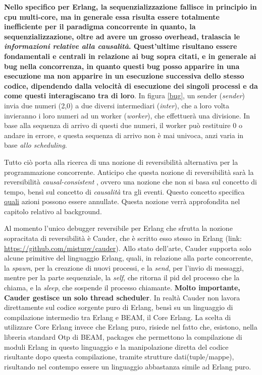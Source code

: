 \documentclass[Tesi.tex]{subfiles}
\begin{document}
\textbf{Nello specifico per Erlang, la sequenzializzazione fallisce in principio in cpu multi-core, ma in generale essa risulta essere totalmente inefficiente per il paradigma concorrente in quanto, la sequenzializzazione, oltre ad avere un grosso overhead, tralascia le \textit{informazioni relative alla causalità}. Quest'ultime risultano essere fondamentali e centrali in relazione ai bug sopra citati, e in generale ai bug nella concorrenza, in quanto questi bug posso apparire in una esecuzione ma non apparire in un esecuzione successiva dello stesso codice, dipendendo dalla velocità di esecuzione dei singoli processi e da come questi interagiscano tra di loro}.
In figura \ref{bug}, un sender (\textit{sender}) invia due numeri (2,0) a due diversi intermediari (\textit{inter}), che a loro volta invieranno i loro numeri ad un worker (\textit{worker}), che effettuerà una divisione. In base alla sequenza di arrivo di questi due numeri, il worker può restituire 0 o andare in errore, e questa sequenza di arrivo non è mai univoca, anzi varia in base \textit{allo scheduling}.

Tutto ciò porta alla ricerca di una nozione di reversibilità alternativa per la programmazione concorrente.
Anticipo che questa nozione di reversibilità sarà la reversibilità \textit{causal-consistent} \cite{causal}, ovvero una nozione che non si basa sul concetto di tempo, bensì sul concetto di \textit{causalità} tra gli eventi.
Questo concetto specifica \underline{quali} azioni possono essere annullate.
Questa nozione verrà approfondita nel capitolo relativo al background.

Al momento l'unico debugger reversibile per Erlang che sfrutta la nozione sopracitata di reversibilità è Cauder, che è scritto esso stesso in Erlang (link: \href{https://github.com/mistupv/cauder}{https://github.com/mistupv/cauder}).
Allo stato dell'arte, Cauder supporta solo alcune primitive del linguaggio Erlang, quali, in relazione alla parte concorrente, la \textit{spawn}, per la creazione di nuovi processi, e la \textit{send}, per l'invio di messaggi, mentre per la parte sequenziale, la \textit{self}, che ritorna il pid del processo che la chiama, e la \textit{sleep}, che sospende il processo chiamante.
\textbf{Molto importante, Cauder gestisce un solo thread scheduler}.
In realtà Cauder non lavora direttamente sul codice sorgente puro di Erlang, bensì su un linguaggio di compilazione intermedio tra Erlang e BEAM, il Core Erlang\cite{coreErlang}.
La scelta di utilizzare Core Erlang invece che Erlang puro, risiede nel fatto che, esistono, nella libreria standard Otp di BEAM, packages che permettono la compilazione di moduli Erlang in questo linguaggio e la manipolazione diretta del codice risultante dopo questa compilazione, tramite strutture dati(tuple/mappe), risultando nel contempo essere un linguaggio abbastanza simile ad Erlang puro.
\end{document}
